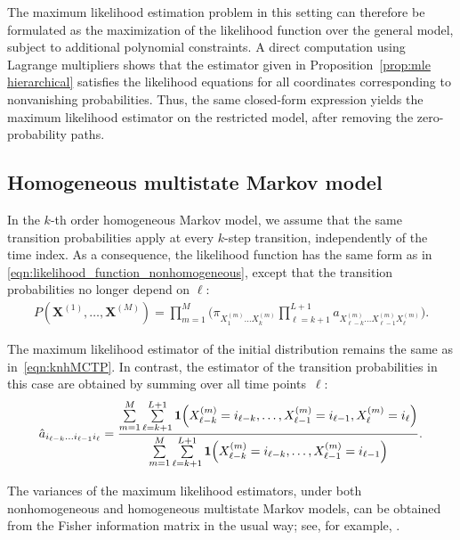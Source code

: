 \documentclass[11pt, a4paper]{article}
\numberwithin{equation}{section}
\theoremstyle{plain}
\theoremstyle{definition}
\begin{document}
The maximum likelihood estimation problem in this setting can therefore be formulated as
the maximization of the likelihood function over the general model, subject to additional
polynomial constraints.
A direct computation using Lagrange multipliers shows that the estimator given in
Proposition~\ref{prop:mle hierarchical} satisfies the likelihood equations for all
coordinates corresponding to nonvanishing probabilities.
Thus, the same closed-form expression yields the maximum likelihood estimator on the
restricted model, after removing the zero-probability paths.




\subsection{Homogeneous multistate Markov model} \label{subsec:homogeneous_MLE}

In the $k$-th order homogeneous Markov model, we assume that the same transition
probabilities apply at every $k$-step transition, independently of the time index.
As a consequence, the likelihood function has the same form as in
\eqref{eqn:likelihood_function_nonhomogeneous}, except that the transition
probabilities no longer depend on $\ell$:
\begin{align}
P(\mathbf{X}^{(1)}, \dots, \mathbf{X}^{(M)})
=
\prod_{m=1}^{M}
\biggl(
\pi_{X_1^{(m)} \dots X_k^{(m)}}
\prod_{\ell=k+1}^{L+1}
a_{X_{\ell-k}^{(m)} \dots X_{\ell-1}^{(m)} X_\ell^{(m)}}
\biggr).
\end{align}

The maximum likelihood estimator of the initial distribution remains the same as
in~\eqref{eqn:knhMCTP}. In contrast, the estimator of the transition probabilities
in this case are obtained by summing over all time points~$\ell$:
\begin{align}
\hat{a}_{i_{\ell-k} \dots i_{\ell-1} i_\ell}
=
\frac{
\sum\limits_{m=1}^M \sum\limits_{\ell=k+1}^{L+1}
{\bf 1}\!\left(
X_{\ell-k}^{(m)} = i_{\ell-k}, \dots,
X_{\ell-1}^{(m)} = i_{\ell-1},
X_{\ell}^{(m)} = i_{\ell}
\right)
}{
\sum\limits_{m=1}^M \sum\limits_{\ell=k+1}^{L+1}
{\bf 1}\!\left(
X_{\ell-k}^{(m)} = i_{\ell-k}, \dots,
X_{\ell-1}^{(m)} = i_{\ell-1}
\right)
}.
\label{eqn:khMCTP}
\end{align}

The variances of the maximum likelihood estimators, under both nonhomogeneous and homogeneous multistate Markov models, can be obtained from the Fisher information matrix in the usual way; see, for example, \cite[Chapter~7]{vanderVaart2000}.
\end{document}
